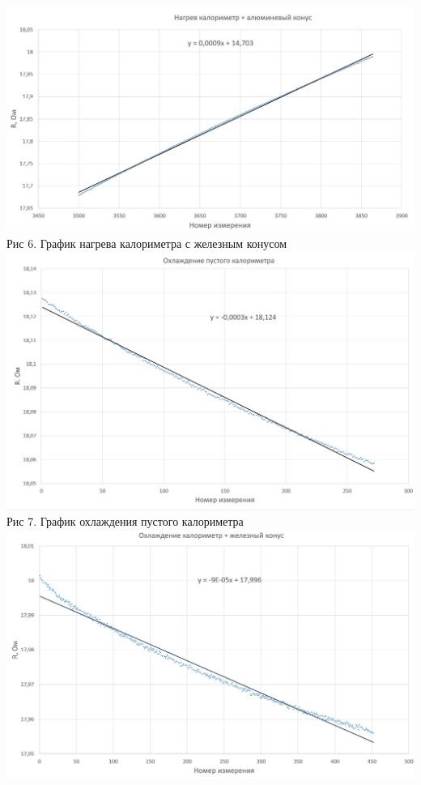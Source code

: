 \documentclass[a4paper, 12pt]{article}
\begin{document}
\begin{center}
		\includegraphics[width=15cm]{"Нагрев_алюм.jpg"}\\
		Рис 6. График нагрева калориметра с железным конусом
		\includegraphics[width=15cm]{"Охлаждение пустого.jpg"}\\
		Рис 7.  График охлаждения пустого калориметра
		\includegraphics[width=15cm]{"Охлаждение железо.jpg"}\\

\end{center}
\end{document}
